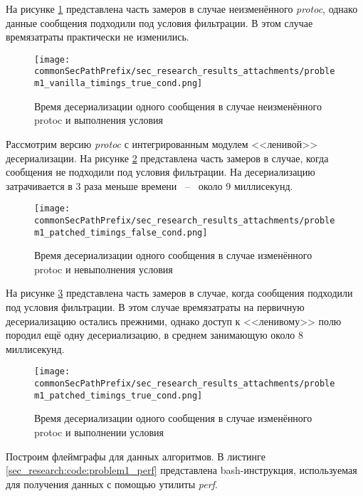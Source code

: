 На рисунке \ref{fig:problem1_vanilla_timings_true_cond} представлена часть замеров в случае неизменённого \textit{protoc}, однако данные сообщения подходили под условия фильтрации. В этом случае времязатраты практически не изменились.

\begin{figure}[ht]
    \centering
    \texttt{[image: \\commonSecPathPrefix/sec\_research\_results\_attachments/problem1\_vanilla\_timings\_true\_cond.png]}
    \caption{Время десериализации одного сообщения в случае неизменённого protoc и выполнения условия}
    \label{fig:problem1_vanilla_timings_true_cond}
\end{figure}

Рассмотрим версию \textit{protoc} с интегрированным модулем <<ленивой>> десериализации.
На рисунке \ref{fig:problem1_patched_timings_false_cond} представлена часть замеров в случае, когда сообщения не подходили под условия фильтрации. На десериализацию затрачивается в 3 раза меньше времени ~--~ около 9 миллисекунд.

\begin{figure}[ht]
    \centering
    \texttt{[image: \\commonSecPathPrefix/sec\_research\_results\_attachments/problem1\_patched\_timings\_false\_cond.png]}
    \caption{Время десериализации одного сообщения в случае изменённого protoc и невыполнения условия}
    \label{fig:problem1_patched_timings_false_cond}
\end{figure}

На рисунке \ref{fig:problem1_patched_timings_true_cond} представлена часть замеров в случае, когда сообщения подходили под условия фильтрации. В этом случае времязатраты на первичную десериализацию остались прежними, однако доступ к <<ленивому>> полю породил ещё одну десериализацию, в среднем занимающую около 8 миллисекунд. 

\begin{figure}[ht]
    \centering
    \texttt{[image: \\commonSecPathPrefix/sec\_research\_results\_attachments/problem1\_patched\_timings\_true\_cond.png]}
    \caption{Время десериализации одного сообщения в случае изменённого protoc и выполнении условия}
    \label{fig:problem1_patched_timings_true_cond}
\end{figure}

Построим флеймграфы для данных алгоритмов. В листинге \ref{sec_research:code:problem1_perf} представлена bash-инструкция, используемая для получения данных с помощью утилиты \textit{perf}.

